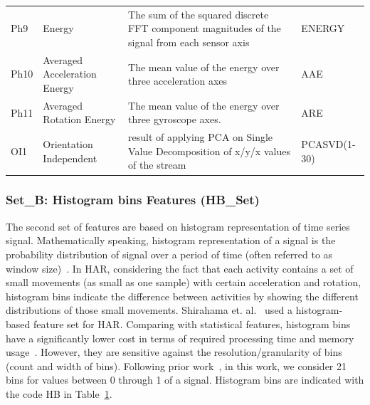 \documentclass[journal,article,submit,moreauthors,pdftex]{Definitions/mdpi}
\begin{document}
\begin{table}[H]
\begin{tabular}{p{0.9cm}p{5cm}p{7cm}p{1.3cm}}
		Ph9&Energy&{\scriptsize The sum of the squared discrete FFT component magnitudes of the signal from each sensor axis} & ENERGY \\
		Ph10&Averaged Acceleration Energy&{\scriptsize The mean value of the energy over three acceleration axes} & AAE \\
		Ph11&Averaged Rotation Energy&{\scriptsize The mean value of the energy over three gyroscope axes. } & ARE \\
		OI1&Orientation Independent&{\scriptsize result of applying PCA on Single Value Decomposition  of x/y/x values of the stream } & PCASVD(1-30) \\
		\bottomrule
	\end{tabular}
	\label{features_table}
\end{table}


\subsubsection{Set\_B: Histogram bins Features (HB\_Set)}
The second set of features are based on histogram representation of time series signal. Mathematically speaking, histogram representation of a signal is the probability distribution of signal over a period of time (often referred to as window size)~\cite{zardoshti1995emg}. In HAR, considering the fact that each activity contains a set of small movements (as small as one sample) with certain acceleration and rotation, histogram bins indicate the difference between activities by showing the different distributions of those small movements. Shirahama et. al.~\cite{shirahama2016codebook} used a histogram-based feature set for HAR. Comparing with statistical features, histogram bins have a significantly lower cost in terms of required processing time and memory usage~\cite{Sarbishei2019platform}. However, they are sensitive against the resolution/granularity of bins (count and width of bins). Following prior work~\cite{xi2017evaluation}, in this work, we consider 21 bins for values between 0 through 1 of a signal. Histogram bins are indicated with the code HB in Table~\ref{features_table}.
\end{document}
